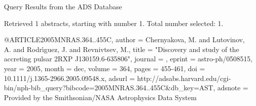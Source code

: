Query Results from the ADS Database


Retrieved 1 abstracts, starting with number 1.  Total number selected: 1.

@ARTICLE{2005MNRAS.364..455C,
   author = {{Chernyakova}, M. and {Lutovinov}, A. and {Rodr{\'{\i}}guez}, J. and 
	{Revnivtsev}, M.},
    title = "{Discovery and study of the accreting pulsar 2RXP J130159.6-635806}",
  journal = {\mnras},
   eprint = {astro-ph/0508515},
     year = 2005,
    month = dec,
   volume = 364,
    pages = {455-461},
      doi = {10.1111/j.1365-2966.2005.09548.x},
   adsurl = {http://adsabs.harvard.edu/cgi-bin/nph-bib_query?bibcode=2005MNRAS.364..455C&db_key=AST},
  adsnote = {Provided by the Smithsonian/NASA Astrophysics Data System}
}


